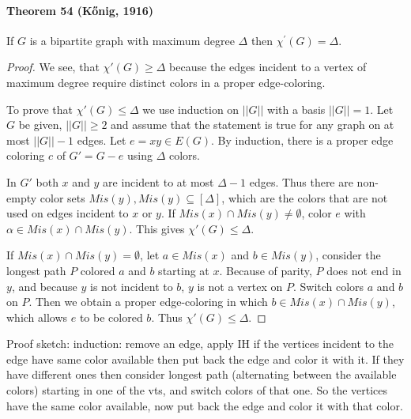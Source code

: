 \paragraph{Theorem 54 (K\H{o}nig, 1916)} If $ G $ is a bipartite graph
with maximum degree $\Delta$ then $\chi^\prime(G) = \Delta$.
\begin{proof}
    We see, that $\chi'(G) \geq \Delta$ because the edges incident to a vertex
    of maximum degree require distinct colors in a proper edge-coloring. 

    \bigskip
    To prove that $\chi'(G) \leq \Delta$ we use induction on $||G||$ with 
    a basis $||G|| =1$. Let $G$ be given, $||G|| \geq 2$ and assume 
    that the statement is true for any graph on at most $||G||-1$ edges.
    Let $e=xy \in E(G)$. By induction, there is a proper edge coloring $c$
    of $G' = G-e$ using $\Delta$ colors.

    \smallskip
    In $G'$ both $x$ and $y$ are incident to at most $\Delta-1$ edges. Thus
    there are non-empty color sets $Mis(y), Mis(y) \subseteq [\Delta]$, which
    are the colors that are not used on edges incident to $x$ or $y$.
    If $Mis(x) \cap Mis(y) \neq \emptyset$, color $e$ with 
    $\alpha \in Mis(x) \cap Mis(y)$. This gives $\chi'(G) \leq \Delta$.

    \smallskip
    If $Mis(x) \cap Mis(y) = \emptyset$, let $a \in Mis(x)$ and $b \in Mis(y)$,
    consider the longest path $P$ colored $a$ and $b$ starting at $x$. Because
    of parity, $P$ does not end in $y$, and because $y$ is not incident to 
    $b$, $y$ is not a vertex on $P$. Switch colors $a$ and $b$ on $P$. 
    Then we obtain a proper edge-coloring in which $b \in Mis(x) \cap Mis(y)$,
    which allows $e$ to be colored $b$. Thus $\chi'(G) \leq \Delta$.
\end{proof}
Proof sketch: induction: remove an edge, apply IH if the vertices incident to 
the edge have same color available then put back the edge and color it with it.
If they have different ones then consider longest path (alternating between
the available colors) starting in one of the 
vts, and switch colors of that one. So the vertices have the same color 
available, now put back the edge and color it with that color.

